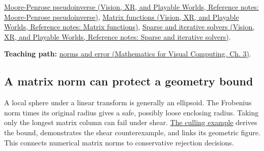 \href{../07-Vision-XR-and-Playable-Worlds/main.pdf\#nameddest=appendix-541306fdbc1b}{Moore-Penrose pseudoinverse (Vision, XR, and Playable Worlds, Reference notes: Moore-Penrose pseudoinverse)}, \href{../07-Vision-XR-and-Playable-Worlds/main.pdf\#nameddest=appendix-0f4bc2bf2b1f}{Matrix functions (Vision, XR, and Playable Worlds, Reference notes: Matrix functions)}, \href{../07-Vision-XR-and-Playable-Worlds/main.pdf\#nameddest=appendix-67c87a3d9e94}{Sparse and iterative solvers (Vision, XR, and Playable Worlds, Reference notes: Sparse and iterative solvers)}.

\textbf{Teaching path:} \href{../02-Mathematics-for-Visual-Computing/main.pdf\#nameddest=01-foundations-i-ch019-matrix-norms-give-scale-to-residuals-and-error-claims}{norms and error (Mathematics for Visual Computing, Ch. 3)}.

\subsection{A matrix norm can protect a geometry bound}\label{appendix-f8657bac66e5-a-matrix-norm-can-protect-a-geometry-bound}

A local sphere under a linear transform is generally an ellipsoid. The Frobenius norm times its original radius gives a safe, possibly loose enclosing radius. Taking only the longest matrix column can fail under shear. \hyperref[04-visual-computing-ii-ch028-a-line-corridor-can-be-a-cheap-prefilter-for-shadow-caster-work]{The culling example} derives the bound, demonstrates the shear counterexample, and links its geometric figure. This connects numerical matrix norms to conservative rejection decisions.
